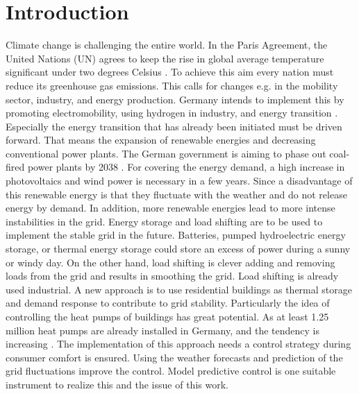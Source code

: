 \chapter{Introduction}
\label{ch:introduction}
Climate change is challenging the entire world. In the Paris Agreement, the United Nations (UN) agrees to keep the rise in global average temperature significant under two degrees Celsius \cite{UnitedNations.2015}. To achieve this aim every nation must reduce its greenhouse gas emissions. This calls for changes e.g. in the mobility sector, industry, and energy production. Germany intends to implement this by promoting electromobility, using hydrogen in industry, and energy transition \cite{Deutschlandfunk.24.06.2021}. Especially  the energy transition that has already been initiated must be driven forward. That means the expansion of renewable energies and decreasing conventional power plants. The German government is aiming to phase out coal-fired power plants by 2038 \cite{bundesregierung.2021}. For covering the energy demand, a high increase in photovoltaics and wind power is necessary in a few years. 
\newline
Since a disadvantage of this renewable energy is that they fluctuate with the weather and do not release energy by demand. In addition, more renewable energies lead to more intense instabilities in the grid. Energy storage and load shifting are to be used to implement the stable grid in the future. Batteries, pumped hydroelectric energy storage, or thermal energy storage could store an excess of power during a sunny or windy day. On the other hand, load shifting is clever adding and removing loads from the grid and results in smoothing the grid. Load shifting is already used industrial. A new approach is to use residential buildings as thermal storage and demand response to contribute to grid stability. Particularly the idea of controlling the heat pumps of buildings has great potential. As at least 1.25 million heat pumps are already installed in Germany, and the tendency is increasing \cite{BMW.2021}.
\newline
The implementation of this approach needs a control strategy during consumer comfort is ensured. Using the weather forecasts and prediction of the grid fluctuations improve the control. Model predictive control is one suitable instrument to realize this and the issue of this work. 

